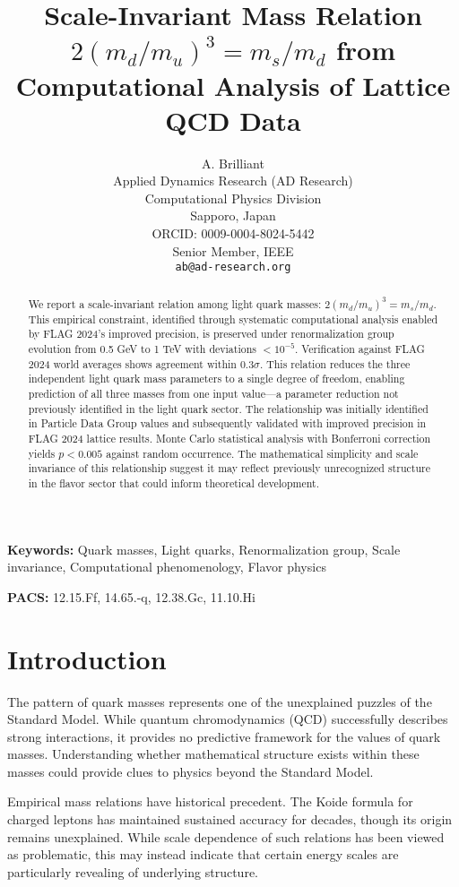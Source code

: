 \documentclass[12pt]{article}
\title{Scale-Invariant Mass Relation $2(m_d/m_u)^3 = m_s/m_d$ from Computational Analysis of Lattice QCD Data}
\author{A. Brilliant \\
\small Applied Dynamics Research (AD Research) \\
\small Computational Physics Division \\
\small Sapporo, Japan \\
\small ORCID: 0009-0004-8024-5442 \\
\small Senior Member, IEEE \\
\small \texttt{ab@ad-research.org}}
\date{}
\begin{document}
\pagestyle{plain}

\maketitle


\begin{abstract}
We report a scale-invariant relation among light quark masses: $2(m_d/m_u)^3 = m_s/m_d$. This empirical constraint, identified through systematic computational analysis enabled by FLAG 2024's improved precision, is preserved under renormalization group evolution from 0.5 GeV to 1 TeV with deviations $<10^{-5}$. Verification against FLAG 2024 world averages shows agreement within $0.3\sigma$. This relation reduces the three independent light quark mass parameters to a single degree of freedom, enabling prediction of all three masses from one input value—a parameter reduction not previously identified in the light quark sector. The relationship was initially identified in Particle Data Group values and subsequently validated with improved precision in FLAG 2024 lattice results. Monte Carlo statistical analysis with Bonferroni correction yields $p < 0.005$ against random occurrence. The mathematical simplicity and scale invariance of this relationship suggest it may reflect previously unrecognized structure in the flavor sector that could inform theoretical development.
\end{abstract}

\textbf{Keywords:} Quark masses, Light quarks, Renormalization group, Scale invariance, Computational phenomenology, Flavor physics

\textbf{PACS:} 12.15.Ff, 14.65.-q, 12.38.Gc, 11.10.Hi

\section{Introduction}
\label{sec:intro}

The pattern of quark masses represents one of the unexplained puzzles of the Standard Model. While quantum chromodynamics (QCD) successfully describes strong interactions, it provides no predictive framework for the values of quark masses. Understanding whether mathematical structure exists within these masses could provide clues to physics beyond the Standard Model.

Empirical mass relations have historical precedent. The Koide formula for charged leptons has maintained sustained accuracy for decades, though its origin remains unexplained. While scale dependence of such relations has been viewed as problematic, this may instead indicate that certain energy scales are particularly revealing of underlying structure.
\end{document}
